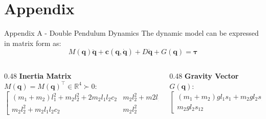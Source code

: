 \section{Appendix}

\begin{frame}{Appendix A - Double Pendulum Dynamics}
    \label{frame:appendixA}
    The dynamic model can be expressed in matrix form as:
    \begin{equation}
        \boxed{M(\mathbf{q})\ddot{\mathbf{q}} + \mathbf{c}(\mathbf{q}, \dot{\mathbf{q}}) + D\dot{\mathbf{q}} + G(\mathbf{q}) = \mathbf{\tau}}
    \end{equation}

    \vspace{1.5em}
    \footnotesize 
    
    \begin{columns}[T]
        \begin{column}{0.48\textwidth}
            \textbf{Inertia Matrix} $M(\mathbf{q}) = M(\mathbf{q})^\top \in \mathbb{R}^4  \succ 0$:
            \begin{equation*}
                \begin{bmatrix}
                    (m_1+m_2)l_1^2 + m_2l_2^2 + 2m_2l_1 l_2c_2 & m_2l_2^2 + m2l_1l_2c_2\\
                    m_2l_2^2 +m_2l_1l_2c_2 & m_2l_2^2
                \end{bmatrix}
            \end{equation*}
        \end{column}
        \begin{column}{0.48\textwidth}
            \textbf{Gravity Vector} $G(\mathbf{q})$:
            \begin{equation*}
                \begin{bmatrix}
                    (m_1+m_2)gl_1s_1 + m_2gl_2s_{12} \\
                    m_2gl_2s_{12}
                \end{bmatrix}
            \end{equation*}
        \end{column}
    \end{columns}
    
    \vspace{2.5em} %
    

\end{frame}

